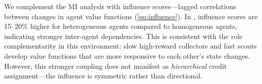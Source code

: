 We complement the MI analysis with influence scores---lagged correlations between changes in agent value functions (\eqref{eq:influence}). In \foraging, influence scores are 15--20\% higher for heterogeneous agents compared to homogeneous agents, indicating stronger inter-agent dependencies. This is consistent with the role complementarity in this environment: slow high-reward collectors and fast scouts develop value functions that are more responsive to each other's state changes. However, this stronger coupling does not manifest as \emph{hierarchical} credit assignment---the influence is symmetric rather than directional.

